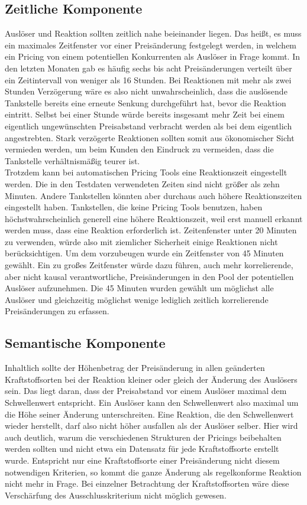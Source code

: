 \subsection{Zeitliche Komponente}
Auslöser und Reaktion sollten zeitlich nahe beieinander liegen. Das heißt, es muss ein maximales Zeitfenster vor einer Preisänderung festgelegt werden, in welchem ein Pricing von einem potentiellen Konkurrenten als Auslöser in Frage kommt. In den letzten Monaten gab es häufig sechs bis acht Preisänderungen verteilt über ein Zeitintervall von weniger als 16 Stunden. Bei Reaktionen mit mehr als zwei Stunden Verzögerung wäre es also nicht unwahrscheinlich, dass die auslösende Tankstelle bereits eine erneute Senkung durchgeführt hat, bevor die Reaktion eintritt. Selbst bei einer Stunde würde bereits insgesamt mehr Zeit bei einem eigentlich ungewünschten Preisabstand verbracht werden als bei dem eigentlich angestrebten. Stark verzögerte Reaktionen sollten somit aus ökonomischer Sicht vermieden werden, um beim Kunden den Eindruck zu vermeiden, dass die Tankstelle verhältnismäßig teurer ist.\\
Trotzdem kann bei automatischen Pricing Tools eine Reaktionszeit eingestellt werden. Die in den Testdaten verwendeten Zeiten sind nicht größer als zehn Minuten. Andere Tankstellen könnten aber durchaus auch höhere Reaktionszeiten eingestellt haben. Tankstellen, die keine Pricing Tools benutzen, haben höchstwahrscheinlich generell eine höhere Reaktionszeit, weil erst manuell erkannt werden muss, dass eine Reaktion erforderlich ist. Zeitenfenster unter 20 Minuten zu verwenden, würde also mit ziemlicher Sicherheit einige Reaktionen nicht berücksichtigen. Um dem vorzubeugen wurde ein Zeitfenster von 45 Minuten gewählt. Ein zu großes Zeitfenster würde dazu führen, auch mehr korrelierende, aber nicht kausal verantwortliche, Preisänderungen in den Pool der potentiellen Auslöser aufzunehmen. Die 45 Minuten wurden gewählt um möglichst alle Auslöser und gleichzeitig möglichst wenige lediglich zeitlich korrelierende Preisänderungen zu erfassen.

\subsection{Semantische Komponente}
Inhaltlich sollte der Höhenbetrag der Preisänderung in allen geänderten Kraftstoffsorten bei der Reaktion kleiner oder gleich der Änderung des Auslösers sein. Das liegt daran, dass der Preisabstand vor einem Auslöser maximal dem Schwellenwert entspricht. Ein Auslöser kann den Schwellenwert also maximal um die Höhe seiner Änderung unterschreiten. Eine Reaktion, die den Schwellenwert wieder herstellt, darf also nicht höher ausfallen als der Auslöser selber. Hier wird auch deutlich, warum die verschiedenen Strukturen der Pricings beibehalten werden sollten und nicht etwa ein Datensatz für jede Kraftstoffsorte erstellt wurde. Entspricht nur eine Kraftstoffsorte einer Preisänderung nicht diesem notwendigen Kriterien, so kommt die ganze Änderung als regelkonforme Reaktion nicht mehr in Frage. Bei einzelner Betrachtung der Kraftstoffsorten wäre diese Verschärfung des Ausschlusskriterium nicht möglich gewesen.\\

